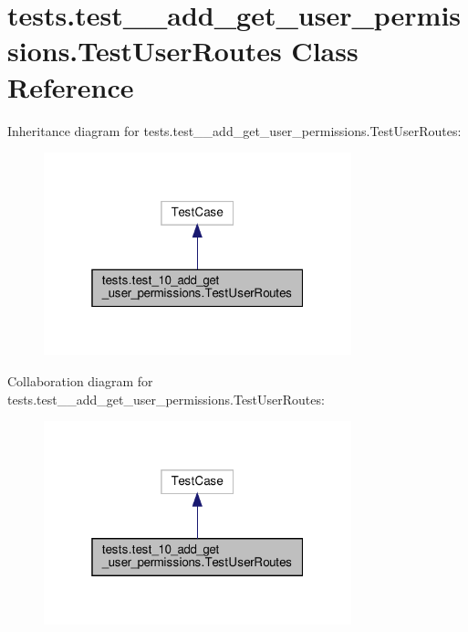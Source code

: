 \hypertarget{classtests_1_1test__10__add__get__user__permissions_1_1_test_user_routes}{}\section{tests.\+test\+\_\+\_\+add\+\_\+get\+\_\+user\+\_\+permissions.\+Test\+User\+Routes Class Reference}
\label{classtests_1_1test__10__add__get__user__permissions_1_1_test_user_routes}


Inheritance diagram for tests.\+test\+\_\+\_\+add\+\_\+get\+\_\+user\+\_\+permissions.\+Test\+User\+Routes\+:
\nopagebreak
\begin{figure}[H]
\begin{center}
\leavevmode
\includegraphics[width=253pt]{classtests_1_1test__10__add__get__user__permissions_1_1_test_user_routes__inherit__graph}
\end{center}
\end{figure}


Collaboration diagram for tests.\+test\+\_\+\_\+add\+\_\+get\+\_\+user\+\_\+permissions.\+Test\+User\+Routes\+:
\nopagebreak
\begin{figure}[H]
\begin{center}
\leavevmode
\includegraphics[width=253pt]{classtests_1_1test__10__add__get__user__permissions_1_1_test_user_routes__coll__graph}
\end{center}
\end{figure}
